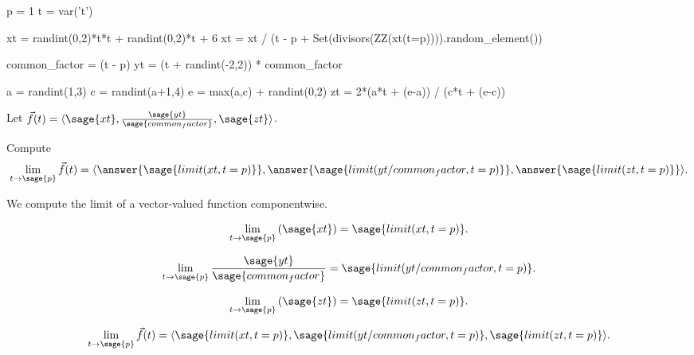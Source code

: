 \documentclass{ximera}
\author{Jim Fowler}
\begin{document}
\makerandom

\begin{sagesilent}
  p = 1
  t = var('t')
  
  xt = randint(0,2)*t*t + randint(0,2)*t + 6
  xt = xt / (t - p + Set(divisors(ZZ(xt(t=p)))).random_element())

  common_factor = (t - p)
  yt = (t + randint(-2,2)) * common_factor

  a = randint(1,3)
  c = randint(a+1,4)
  e = max(a,c) + randint(0,2)
  zt = 2*(a*t + (e-a)) / (c*t + (e-c))
\end{sagesilent}

\begin{exercise}

  Let $\vec{f}(t) = \langle \sage{xt}, \frac{\sage{yt}}{\sage{common_factor}}, \sage{zt} \rangle$.

  Compute
  \[
    \lim_{t \to \sage{p}} \vec{f}(t) = \langle \answer{\sage{limit(xt,t=p)}}, \answer{\sage{limit(yt/common_factor,t=p)}}, \answer{\sage{limit(zt,t=p)}} \rangle.
  \]
  
  \begin{hint}
    We compute the limit of a vector-valued function componentwise.
  \end{hint}

  \begin{hint}
    \[\lim_{t \to \sage{p}} \left( \sage{xt} \right) = \sage{limit(xt,t=p)}.\]
  \end{hint}

  \begin{hint}
    \[\lim_{t \to \sage{p}} \frac{\sage{yt}}{\sage{common_factor}} = \sage{limit(yt/common_factor,t=p)}.\]
  \end{hint}

  \begin{hint}
    \[\lim_{t \to \sage{p}} \left( \sage{zt} \right) = \sage{limit(zt,t=p)}.\]
  \end{hint}
  
  \begin{hint}
    \[\lim_{t \to \sage{p}} \vec{f}(t) = \langle \sage{limit(xt,t=p)}, \sage{limit(yt/common_factor,t=p)}, \sage{limit(zt,t=p)} \rangle.\]
  \end{hint}          
  
\end{exercise}
\end{document}
